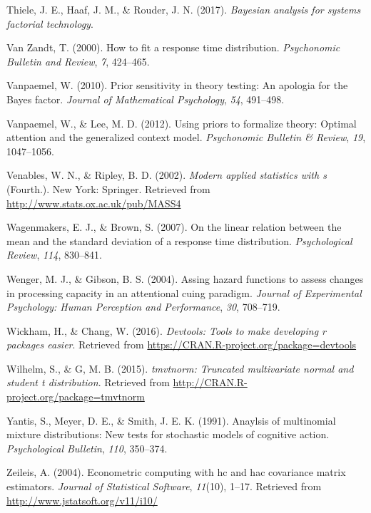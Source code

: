 \documentclass[english,man]{apa6}
\theoremstyle{definition}
\theoremstyle{definition}
\theoremstyle{remark}
\begin{document}
\hypertarget{ref-Thiele:etal:2017}{}
Thiele, J. E., Haaf, J. M., \& Rouder, J. N. (2017). \emph{Bayesian
analysis for systems factorial technology}.

\hypertarget{ref-VanZandt:2000}{}
Van Zandt, T. (2000). How to fit a response time distribution.
\emph{Psychonomic Bulletin and Review}, \emph{7}, 424--465.

\hypertarget{ref-Vanpaemel:2010}{}
Vanpaemel, W. (2010). Prior sensitivity in theory testing: An apologia
for the Bayes factor. \emph{Journal of Mathematical Psychology},
\emph{54}, 491--498.

\hypertarget{ref-Vanpaemel:Lee:2012}{}
Vanpaemel, W., \& Lee, M. D. (2012). Using priors to formalize theory:
Optimal attention and the generalized context model. \emph{Psychonomic
Bulletin \& Review}, \emph{19}, 1047--1056.

\hypertarget{ref-R-MASS}{}
Venables, W. N., \& Ripley, B. D. (2002). \emph{Modern applied
statistics with s} (Fourth.). New York: Springer. Retrieved from
\url{http://www.stats.ox.ac.uk/pub/MASS4}

\hypertarget{ref-Wagenmakers:Brown:2007}{}
Wagenmakers, E. J., \& Brown, S. (2007). On the linear relation between
the mean and the standard deviation of a response time distribution.
\emph{Psychological Review}, \emph{114}, 830--841.

\hypertarget{ref-Wenger:Gibson:2004}{}
Wenger, M. J., \& Gibson, B. S. (2004). Assing hazard functions to
assess changes in processing capacity in an attentional cuing paradigm.
\emph{Journal of Experimental Psychology: Human Perception and
Performance}, \emph{30}, 708--719.

\hypertarget{ref-R-devtools}{}
Wickham, H., \& Chang, W. (2016). \emph{Devtools: Tools to make
developing r packages easier}. Retrieved from
\url{https://CRAN.R-project.org/package=devtools}

\hypertarget{ref-R-tmvtnorm}{}
Wilhelm, S., \& G, M. B. (2015). \emph{tmvtnorm: Truncated multivariate
normal and student t distribution}. Retrieved from
\url{http://CRAN.R-project.org/package=tmvtnorm}

\hypertarget{ref-Yantis:etal:1991}{}
Yantis, S., Meyer, D. E., \& Smith, J. E. K. (1991). Anaylsis of
multinomial mixture distributions: New tests for stochastic models of
cognitive action. \emph{Psychological Bulletin}, \emph{110}, 350--374.

\hypertarget{ref-R-sandwich_a}{}
Zeileis, A. (2004). Econometric computing with hc and hac covariance
matrix estimators. \emph{Journal of Statistical Software},
\emph{11}(10), 1--17. Retrieved from
\url{http://www.jstatsoft.org/v11/i10/}
\end{document}
